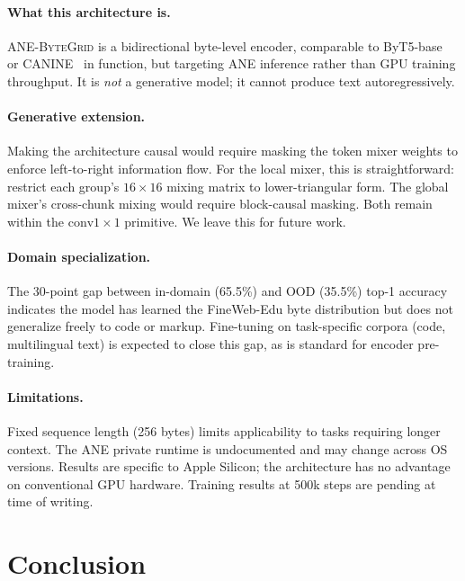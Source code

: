 \documentclass[10pt,twocolumn]{article}
\newcommand{\bytegrid}{\textsc{ANE-ByteGrid}}
\begin{document}
\paragraph{What this architecture is.}
\bytegrid{} is a bidirectional byte-level encoder, comparable to
ByT5-base~\cite{TODO_xue_byt5} or CANINE~\cite{TODO_clark_canine}
in function, but targeting ANE inference rather than GPU training throughput.
It is \emph{not} a generative model; it cannot produce text autoregressively.

\paragraph{Generative extension.}
Making the architecture causal would require masking the token mixer weights
to enforce left-to-right information flow.
For the local mixer, this is straightforward: restrict each group's
$16{\times}16$ mixing matrix to lower-triangular form.
The global mixer's cross-chunk mixing would require block-causal masking.
Both remain within the $\text{conv}1{\times}1$ primitive.
We leave this for future work.

\paragraph{Domain specialization.}
The 30-point gap between in-domain (65.5\%) and OOD (35.5\%) top-1 accuracy
indicates the model has learned the FineWeb-Edu byte distribution
but does not generalize freely to code or markup.
Fine-tuning on task-specific corpora (code, multilingual text) is expected
to close this gap, as is standard for encoder pre-training.

\paragraph{Limitations.}
Fixed sequence length (256 bytes) limits applicability to tasks requiring
longer context.
The ANE private runtime is undocumented and may change across OS versions.
Results are specific to Apple Silicon; the architecture has no advantage on
conventional GPU hardware.
Training results at 500k steps are pending at time of writing.

\section{Conclusion}
\label{sec:conclusion}
\end{document}
